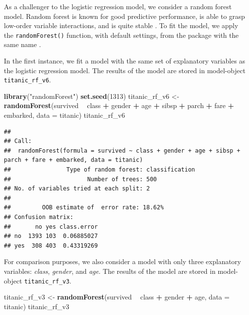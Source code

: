 \documentclass[]{krantz}
\newenvironment{Shaded}{\begin{snugshade}}{\end{snugshade}}
\newcommand{\DataTypeTok}[1]{\textcolor[rgb]{0.13,0.29,0.53}{#1}}
\newcommand{\DecValTok}[1]{\textcolor[rgb]{0.00,0.00,0.81}{#1}}
\newcommand{\KeywordTok}[1]{\textcolor[rgb]{0.13,0.29,0.53}{\textbf{#1}}}
\newcommand{\NormalTok}[1]{#1}
\newcommand{\OperatorTok}[1]{\textcolor[rgb]{0.81,0.36,0.00}{\textbf{#1}}}
\newcommand{\StringTok}[1]{\textcolor[rgb]{0.31,0.60,0.02}{#1}}
\begin{document}
As a challenger to the logistic regression model, we consider a random forest model. Random forest is known for good predictive performance, is able to grasp low-order variable interactions, and is quite stable \citep{randomForestBreiman}. To fit the model, we apply the \texttt{randomForest()} function, with default settings, from the package with the same name \citep{randomForest}.

In the first instance, we fit a model with the same set of explanatory variables as the logistic regression model. The results of the model are stored in model-object \texttt{titanic\_rf\_v6}.

\begin{Shaded}
\begin{Highlighting}[]
\KeywordTok{library}\NormalTok{(}\StringTok{"randomForest"}\NormalTok{)}
\KeywordTok{set.seed}\NormalTok{(}\DecValTok{1313}\NormalTok{)}
\NormalTok{titanic_rf_v6 <-}\StringTok{ }\KeywordTok{randomForest}\NormalTok{(survived }\OperatorTok{~}\StringTok{ }\NormalTok{class }\OperatorTok{+}\StringTok{ }\NormalTok{gender }\OperatorTok{+}\StringTok{ }\NormalTok{age }\OperatorTok{+}\StringTok{ }\NormalTok{sibsp }\OperatorTok{+}\StringTok{ }
\StringTok{         }\NormalTok{parch }\OperatorTok{+}\StringTok{ }\NormalTok{fare }\OperatorTok{+}\StringTok{ }\NormalTok{embarked, }\DataTypeTok{data =}\NormalTok{ titanic)}
\NormalTok{titanic_rf_v6}
\end{Highlighting}
\end{Shaded}

\begin{verbatim}
## 
## Call:
##  randomForest(formula = survived ~ class + gender + age + sibsp +      parch + fare + embarked, data = titanic) 
##                Type of random forest: classification
##                      Number of trees: 500
## No. of variables tried at each split: 2
## 
##         OOB estimate of  error rate: 18.62%
## Confusion matrix:
##       no yes class.error
## no  1393 103  0.06885027
## yes  308 403  0.43319269
\end{verbatim}

For comparison purposes, we also consider a model with only three explanatory variables: \emph{class}, \emph{gender}, and \emph{age}. The results of the model are stored in model-object \texttt{titanic\_rf\_v3}.

\begin{Shaded}
\begin{Highlighting}[]
\NormalTok{titanic_rf_v3 <-}\StringTok{ }\KeywordTok{randomForest}\NormalTok{(survived }\OperatorTok{~}\StringTok{ }\NormalTok{class }\OperatorTok{+}\StringTok{ }\NormalTok{gender }\OperatorTok{+}\StringTok{ }\NormalTok{age, }
         \DataTypeTok{data =}\NormalTok{ titanic)}
\NormalTok{titanic_rf_v3}
\end{Highlighting}
\end{Shaded}
\end{document}
